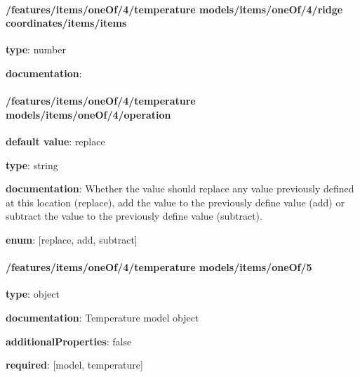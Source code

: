 \begin{itemized}
\begin{itemized}
\paragraph{/features/items/oneOf/4/temperature models/items/oneOf/4/ridge coordinates/items/items} \begin{itemized}
\item {\bf type}: number
\end{itemized}\item {\bf documentation}: 
\end{itemized}\end{itemized}\paragraph{/features/items/oneOf/4/temperature models/items/oneOf/4/operation} \begin{itemized}
\item {\bf default value}: replace
\item {\bf type}: string
\item {\bf documentation}: Whether the value should replace any value previously defined at this location (replace), add the value to the previously define value (add) or subtract the value to the previously define value (subtract).
\item {\bf enum}: [replace, add, subtract]\end{itemized}\paragraph{/features/items/oneOf/4/temperature models/items/oneOf/5} \begin{itemized}
\item {\bf type}: object
\item {\bf documentation}: Temperature model object
\item {\bf additionalProperties}: false
\item {\bf required}: [model, temperature]\end{itemized}
